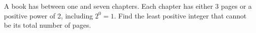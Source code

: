 A book has between one and seven chapters. Each chapter has either 3 pages or a positive power of 2, including $2^0=1$. Find the least positive integer that cannot be its total number of pages.
